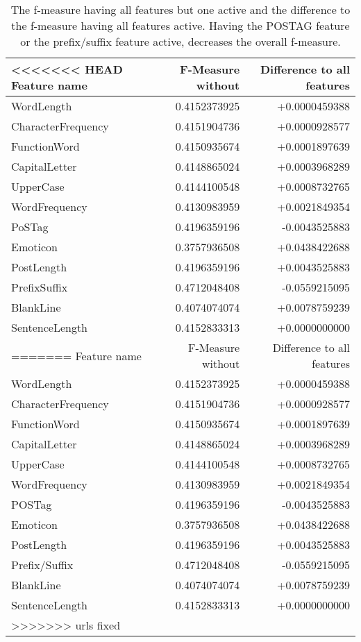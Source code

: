 \begin{table}[h]
	\begin{center}
    \begin{tabular}{l|r|r}
<<<<<<< HEAD
	Feature name		& F-Measure without & Difference to all features \\ \hline
	WordLength			& 0.4152373925 & +0.0000459388 \\ \hline
	CharacterFrequency	& 0.4151904736 & +0.0000928577 \\ \hline
	FunctionWord		& 0.4150935674 & +0.0001897639 \\ \hline
	CapitalLetter		& 0.4148865024 & +0.0003968289 \\ \hline
	UpperCase			& 0.4144100548 & +0.0008732765 \\ \hline
	WordFrequency		& 0.4130983959 & +0.0021849354 \\ \hline
	PoSTag				& 0.4196359196 & -0.0043525883 \\ \hline
	Emoticon			& 0.3757936508 & +0.0438422688 \\ \hline
	PostLength			& 0.4196359196 & +0.0043525883 \\ \hline
	PrefixSuffix		& 0.4712048408 & -0.0559215095 \\ \hline
	BlankLine			& 0.4074074074 & +0.0078759239 \\ \hline
	SentenceLength		& 0.4152833313 & +0.0000000000 \\
=======
	Feature name & F-Measure without & Difference to all features \\ \hline
	WordLength & 0.4152373925 & +0.0000459388 \\ \hline
	CharacterFrequency & 0.4151904736 & +0.0000928577 \\ \hline
	FunctionWord  & 0.4150935674 & +0.0001897639 \\ \hline
	CapitalLetter & 0.4148865024 & +0.0003968289 \\ \hline
	UpperCase & 0.4144100548 & +0.0008732765 \\ \hline
	WordFrequency &	0.4130983959 & +0.0021849354 \\ \hline
	POSTag & 0.4196359196 & -0.0043525883 \\ \hline
	Emoticon &	0.3757936508 & +0.0438422688 \\ \hline
	PostLength & 0.4196359196 & +0.0043525883 \\ \hline
	Prefix/Suffix & 0.4712048408 & -0.0559215095 \\ \hline
	BlankLine & 0.4074074074 & +0.0078759239 \\ \hline
	SentenceLength & 0.4152833313 & +0.0000000000 \\
>>>>>>> urls fixed
    \end{tabular}
    \end{center}
	\caption{The f-measure having all features but one active and the difference to the f-measure having all features active. Having the POSTAG feature or the prefix/suffix feature active, decreases the overall f-measure.}
	\label{tab:feature_evaluation_1}
\end{table}

